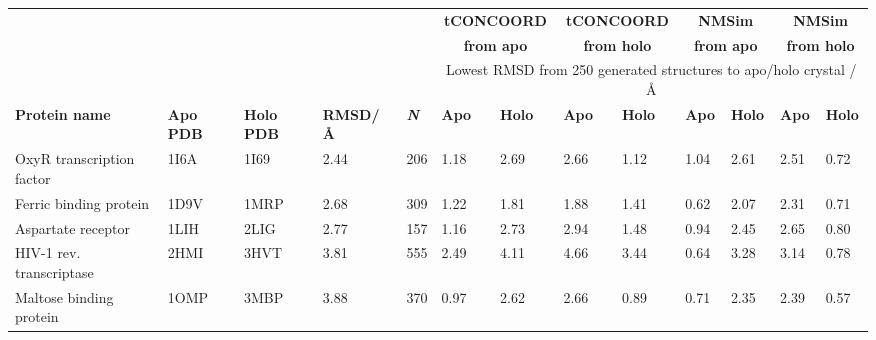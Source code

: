 \begin{table}
\centering

\begin{footnotesize}
\begin{tabular}{ r r r r r l l l l l l l l }
\hline
      &       &       &       &       & \multicolumn{2}{c}{\textbf{tCONCOORD}} & \multicolumn{2}{c}{\textbf{tCONCOORD}} & \multicolumn{2}{c}{\textbf{NMSim}} & \multicolumn{2}{c}{\textbf{NMSim}} \\
      &       &       &       &       & \multicolumn{2}{c}{\textbf{from apo}} & \multicolumn{2}{c}{\textbf{from holo}} & \multicolumn{2}{c}{\textbf{from apo}} & \multicolumn{2}{c}{\textbf{from holo}} \\
      &       &       &       &       & \multicolumn{8}{c}{Lowest RMSD from 250 generated structures to apo/holo crystal / \AA} \\
\multicolumn{1}{l}{\textbf{Protein name}} & \multicolumn{1}{l}{\textbf{Apo PDB}} & \multicolumn{1}{l}{\textbf{Holo PDB}} & \multicolumn{1}{l}{\textbf{RMSD\newline / \AA}} & \multicolumn{1}{l}{\textit{\textbf{N}}} & \textbf{Apo} & \textbf{Holo} & \textbf{Apo} & \textbf{Holo} & \textbf{Apo} & \textbf{Holo} & \textbf{Apo} & \textbf{Holo} \\
\hline
\multicolumn{1}{l}{OxyR transcription factor} & \multicolumn{1}{l}{1I6A} & \multicolumn{1}{l}{1I69} & \multicolumn{1}{l}{2.44} & \multicolumn{1}{l}{206} & 1.18  & 2.69  & 2.66  & 1.12  & 1.04  & 2.61  & 2.51  & 0.72 \\
\multicolumn{1}{l}{Ferric binding protein}    & \multicolumn{1}{l}{1D9V} & \multicolumn{1}{l}{1MRP} & \multicolumn{1}{l}{2.68} & \multicolumn{1}{l}{309} & 1.22  & 1.81  & 1.88  & 1.41  & 0.62  & 2.07  & 2.31  & 0.71 \\
\multicolumn{1}{l}{Aspartate receptor}        & \multicolumn{1}{l}{1LIH} & \multicolumn{1}{l}{2LIG} & \multicolumn{1}{l}{2.77} & \multicolumn{1}{l}{157} & 1.16  & 2.73  & 2.94  & 1.48  & 0.94  & 2.45  & 2.65  & 0.80 \\
\multicolumn{1}{l}{HIV-1 rev. transcriptase}  & \multicolumn{1}{l}{2HMI} & \multicolumn{1}{l}{3HVT} & \multicolumn{1}{l}{3.81} & \multicolumn{1}{l}{555} & 2.49  & 4.11  & 4.66  & 3.44  & 0.64  & 3.28  & 3.14  & 0.78 \\
\multicolumn{1}{l}{Maltose binding protein}   & \multicolumn{1}{l}{1OMP} & \multicolumn{1}{l}{3MBP} & \multicolumn{1}{l}{3.88} & \multicolumn{1}{l}{370} & 0.97  & 2.62  & 2.66  & 0.89  & 0.71  & 2.35  & 2.39  & 0.57 \\

\end{tabular}
\end{footnotesize}
\end{table}
